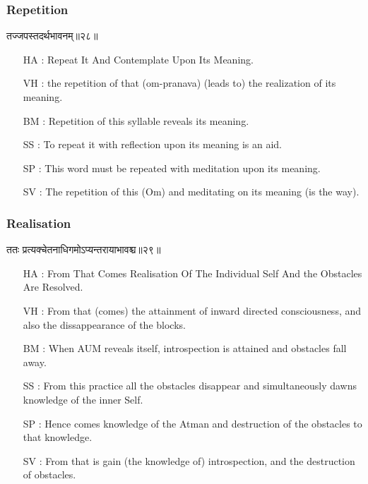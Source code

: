 \begin{frame}[fragile]\frametitle{Repetition}
\begin{sanskrit}
तज्जपस्तदर्थभावनम्॥२८॥
\end{sanskrit}

	\begin{itemize}
	\item [HA]: Repeat It And Contemplate Upon Its Meaning.
	\item [VH]: the repetition of that (om-pranava) (leads to) the realization of its meaning.
	\item [BM]: Repetition of this syllable reveals its meaning.
	\item [SS]: To repeat it with reflection upon its meaning is an aid.
	\item [SP]: This word must be repeated with meditation upon its meaning.
	\item [SV]: The repetition of this (Om) and meditating on its meaning (is the way). 
	\end{itemize}
\end{frame}


\begin{frame}[fragile]\frametitle{Realisation}
\begin{sanskrit}
ततः प्रत्यक्चेतनाधिगमोऽप्यन्तरायाभावश्च॥२९॥
\end{sanskrit}

	\begin{itemize}
	\item [HA]: From That Comes Realisation Of The Individual Self And the Obstacles Are Resolved.
	\item [VH]: From that (comes) the attainment of inward directed consciousness, and also the dissappearance of the blocks.
	\item [BM]: When AUM reveals itself, introspection is attained and obstacles fall away.
	\item [SS]: From this practice all the obstacles disappear and simultaneously dawns knowledge of the inner Self.
	\item [SP]: Hence comes knowledge of the Atman and destruction of the obstacles to that knowledge.
	\item [SV]: From that is gain (the knowledge of) introspection, and the destruction of obstacles. 
	\end{itemize}
\end{frame}




